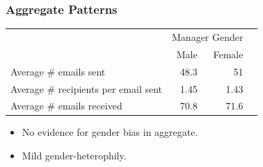 \documentclass[xcolor={table}]{beamer}
\newenvironment{changemargin}[2]{%
  \begin{list}{}{%
    \setlength{\topsep}{0pt}%
    \setlength{\leftmargin}{#1}%
    \setlength{\rightmargin}{#2}%
    \setlength{\listparindent}{\parindent}%
    \setlength{\itemindent}{\parindent}%
    \setlength{\parsep}{\parskip}%
  }%
  \item[]}{\end{list}}
\begin{document}
\begin{frame}\frametitle{Aggregate Patterns}
	
	\begin{changemargin}{-1cm}{ -1cm}
	\Large
	\centering
    \begin{tabular}{lrrr}
      \toprule
      & \multicolumn{2}{c}{Manager Gender} \\
      \cmidrule{2-3}
      & Male & Female  \\
      \midrule
      Average \# emails sent & 48.3 & 51 \\
      Average \# recipients per email sent & 1.45 & 1.43 \\
      \midrule
      Average \# emails received & 70.8 & 71.6 \\
      \bottomrule
    \end{tabular}
	\end{changemargin} 
	
	\bigskip
	\centering
	\Large
	
	
	\begin{itemize}
		\item No evidence for gender bias in aggregate.
		\vspace*{.1in}
		\item Mild gender-heterophily.
	\end{itemize}
	
		
\end{frame}
\end{document}
